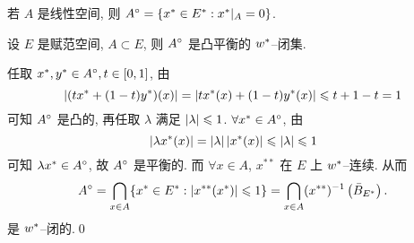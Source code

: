 	\begin{Remark}
		若 $ A $ 是线性空间, 则 $ A^{\circ}=\{ x^{*}\in E^{*}:x^{*}|_{A}=0 \} $.
	\end{Remark}
	\begin{Proposition}\label{prop:极的w*闭性}
		设 $ E $ 是赋范空间, $ A\subset E $, 则 $ A^{\circ} $ 是凸平衡的 $ w^{*} $--闭集.
	\end{Proposition}
	\begin{Proof}
		任取 $ x^{*}, y^{*}\in A^{\circ}, t\in[0, 1] $, 由
		\[
			\left| (tx^{*}+(1-t)y^{*})(x) \right| =\left| tx^{*}(x)+(1-t)y^{*}(x) \right| \leqslant t+1-t=1
		\]
		可知 $ A^{\circ} $ 是凸的, 再任取 $ \lambda $ 满足 $ \left| \lambda \right| \leqslant1 $. $ \forall x^{*}\in A^{\circ} $, 由
		\[
			\left| \lambda x^{*}(x) \right| =\left| \lambda \right| \left| x^{*}(x) \right| \leqslant\left| \lambda \right| \leqslant1
		\]
		可知 $ \lambda x^{*}\in A^{\circ} $, 故 $ A^{\circ} $ 是平衡的. 而 $ \forall x\in A $, $ x^{**} $ 在 $ E $ 上 $ w^{*} $--连续. 从而
		\[
			A^{\circ}=\bigcap_{x\in A}\{ x^{*}\in E^{*}:\left| x^{**}(x^{*}) \right| \leqslant1 \}=\bigcap_{x\in A}(x^{**})^{-1}\left( \bar{B}_{E^{*}} \right).
		\]
		是 $ w^{*} $--闭的.\qed
	\end{Proof}

